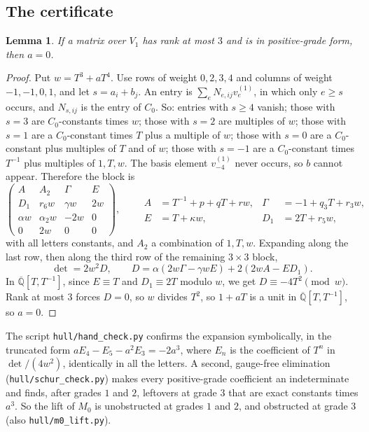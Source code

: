 \documentclass[11pt,a4paper]{article}
\theoremstyle{plain}
\newtheorem{lemma}{Lemma}[section]
\theoremstyle{definition}
\newcommand{\Qbar}{\overline{\mathbb{Q}}}
\newcommand{\scr}[1]{\nolinkurl{#1}}
\begin{document}
\subsection{The certificate}

\begin{lemma}\label{lem:certificate}
If a matrix over $V_{1}$ has rank at most $3$ and is in positive-grade form, then $a=0$.
\end{lemma}

\begin{proof}
Put $w=T^{3}+aT^{4}$. Use rows of weight $0,2,3,4$ and columns of weight $-1,-1,0,1$, and let $s=a_{i}+b_{j}$. An entry is $\sum_{e}N_{e,ij}v_{e}^{(1)}$, in which only $e\ge s$ occurs, and $N_{s,ij}$ is the entry of $C_{0}$. So: entries with $s\ge4$ vanish; those with $s=3$ are $C_{0}$-constants times $w$; those with $s=2$ are multiples of $w$; those with $s=1$ are a $C_{0}$-constant times $T$ plus a multiple of $w$; those with $s=0$ are a $C_{0}$-constant plus multiples of $T$ and of $w$; those with $s=-1$ are a $C_{0}$-constant times $T^{-1}$ plus multiples of $1,T,w$. The basis element $v_{-4}^{(1)}$ never occurs, so $b$ cannot appear. Therefore the block is
\[
\begin{pmatrix}
A & A_{2} & \Gamma & E\\
D_{1} & r_{6}w & \gamma w & 2w\\
\alpha w & \alpha_{2}w & -2w & 0\\
0 & 2w & 0 & 0
\end{pmatrix},
\qquad
\begin{aligned}
A&=T^{-1}+p+qT+rw, & \Gamma&=-1+q_{3}T+r_{3}w,\\
E&=T+\kappa w, & D_{1}&=2T+r_{5}w,
\end{aligned}
\]
with all letters constants, and $A_{2}$ a combination of $1,T,w$. Expanding along the last row, then along the third row of the remaining $3\times3$ block,
\[
\det=2w^{2}D,\qquad D=\alpha(2w\Gamma-\gamma wE)+2(2wA-ED_{1}).
\]
In $\Qbar[T,T^{-1}]$, since $E\equiv T$ and $D_{1}\equiv2T$ modulo $w$, we get $D\equiv-4T^{2}\pmod w$. Rank at most $3$ forces $D=0$, so $w$ divides $T^{2}$, so $1+aT$ is a unit in $\Qbar[T,T^{-1}]$, so $a=0$.
\end{proof}

The script \scr{hull/hand_check.py} confirms the expansion symbolically, in the truncated form $aE_{4}-E_{5}-a^{2}E_{3}=-2a^{3}$, where $E_{n}$ is the coefficient of $T^{n}$ in $\det/(4w^{2})$, identically in all the letters. A second, gauge-free elimination (\scr{hull/schur_check.py}) makes every positive-grade coefficient an indeterminate and finds, after grades $1$ and $2$, leftovers at grade $3$ that are exact constants times $a^{3}$. So the lift of $M_{0}$ is unobstructed at grades $1$ and $2$, and obstructed at grade $3$ (also \scr{hull/m0_lift.py}).
\end{document}
